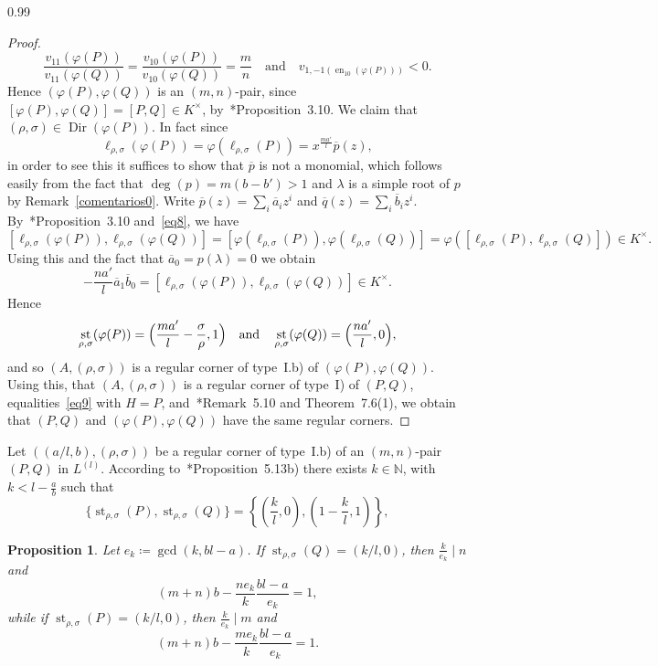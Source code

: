 \documentclass[reqno,a4paper,twoside]{amsart}
\newtheorem{proposition}[theorem]{Proposition}
\theoremstyle{definition}
\theoremstyle{remark}
\DeclareMathOperator{\en}{en}
\DeclareMathOperator{\st}{st}
\DeclareMathOperator{\Dir}{Dir}
\newcommand{\ov}{\overline}
\begin{document}
\begin{spacing}{0.99}
\begin{proof}
$$
\frac{v_{11}(\varphi(P))}{v_{11}(\varphi(Q))} = \frac{v_{10}(\varphi(P))}{v_{10}(\varphi(Q))} = \frac{m}{n}\quad\text{and}\quad v_{1,-1(\en_{10}(\varphi(P)))} < 0.
$$
Hence $(\varphi(P),\varphi(Q))$ is an $(m,n)$-pair, since $[\varphi(P),\varphi(Q)] = [P,Q]\in K^{\times}$, by~\cite{GGV1}*{Proposition~3.10}. We claim that $(\rho,\sigma)\in \Dir(\varphi(P))$. In fact since
$$
\ell_{\rho,\sigma}(\varphi(P)) = \varphi(\ell_{\rho,\sigma}(P)) = x^{\frac{ma'}{l}}\ov p(z),
$$
in order to see this it suffices to show that $\ov p$ is not a monomial, which follows easily from the fact that $\deg(p) = m(b-b')>1$ and $\lambda$ is a simple root of $p$ by Remark~\ref{comentarios0}. Write $\ov p(z)=\sum_i \ov a_iz^i$ and $\ov q(z)=\sum_i \ov b_iz^i$. By~\cite{GGV1}*{Proposition~3.10} and~\eqref{eq8}, we have
$$
[\ell_{\rho,\sigma}(\varphi (P)),\ell_{\rho,\sigma}(\varphi (Q))] = [\varphi(\ell_{\rho,\sigma}(P)),\varphi(\ell_{\rho,\sigma}(Q))] = \varphi([\ell_{\rho,\sigma}(P),\ell_{\rho,\sigma}(Q)]) \in K^{\times}.
$$
Using this and the fact that $\ov a_0 = p(\lambda) = 0$ we obtain
$$
-\frac{n a'}{l}\ov a_1\ov b_0 = [\ell_{\rho,\sigma}(\varphi (P)),\ell_{\rho,\sigma}(\varphi (Q))]\in K^{\times}.
$$
Hence
$$
\st_{\rho,\sigma}(\varphi(P))=\Bigl(\frac{ma'}{l}-\frac{\sigma}{\rho},1\Bigr)\quad\text{and}\quad \st_{\rho,\sigma}(\varphi(Q))=\Bigl(\frac{na'}{l},0\Bigr),
$$
and so $(A,(\rho,\sigma))$ is a regular corner of type~I.b) of $(\varphi(P),\varphi(Q))$. Using this, that $(A,(\rho,\sigma))$ is a regular corner of type~I) of $(P,Q)$, equalities~\eqref{eq9} with $H=P$, and~\cite{GGV1}*{Remark~5.10 and Theorem~7.6(1)}, we obtain that $(P,Q)$ and $(\varphi(P),\varphi(Q))$ have the same regular corners.
\end{proof}

Let $((a/l,b),(\rho,\sigma))$ be a regular corner of type~I.b) of an $(m,n)$-pair $(P,Q)$ in $L^{(l)}$. According to~\cite{GGV1}*{Proposition~5.13b)} there exists $k\in\mathds{N}$, with $k<l-\frac{a}{b}$ such that
\begin{equation}\label{conjunto de starting}
\{\st_{\rho,\sigma}(P),\st_{\rho,\sigma}(Q)\} = \left\{\left(\frac{k}{l},0\right), \left(1-\frac{k}{l},1\right) \right\},
\end{equation}

\begin{proposition}\label{extremosfinales1} Let $e_k\coloneqq  \gcd(k,bl-a)$. If $\st_{\rho,\sigma}(Q) = (k/l,0)$, then $\frac{k}{e_k}\mid n$ and
\begin{equation}\label{ecuacion diofantica}
(m+n)b-\frac{ne_k}{k} \frac{bl-a}{e_k}=1,
\end{equation}
while if $\st_{\rho,\sigma}(P)= (k/l,0)$, then $\frac{k}{e_k}\mid m$ and
\begin{equation}\label{ecuacion diofantica2}
(m+n)b-\frac{me_k}{k} \frac{bl-a}{e_k}=1.
\end{equation}
\end{proposition}


\end{spacing}
\end{document}
